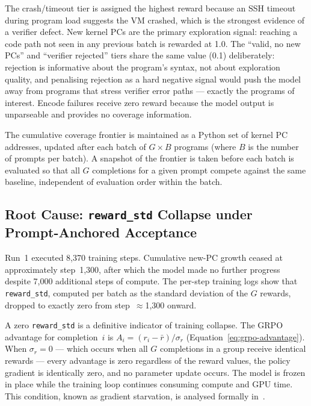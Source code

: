 The crash/timeout tier is assigned the highest reward because an SSH timeout
during program load suggests the VM crashed, which is the strongest evidence of
a verifier defect.
New kernel PCs are the primary exploration signal: reaching a code path not seen
in any previous batch is rewarded at 1.0.
The ``valid, no new PCs'' and ``verifier rejected'' tiers share the same value
(0.1) deliberately: rejection is informative about the program's syntax, not
about exploration quality, and penalising rejection as a hard negative signal
would push the model away from programs that stress verifier error paths ---
exactly the programs of interest.
Encode failures receive zero reward because the model output is unparseable and
provides no coverage information.

The cumulative coverage frontier is maintained as a Python set of kernel PC
addresses, updated after each batch of $G \times B$ programs (where $B$ is the
number of prompts per batch).
A snapshot of the frontier is taken before each batch is evaluated so that all
$G$ completions for a given prompt compete against the same baseline, independent
of evaluation order within the batch.

\subsection{Root Cause: \texttt{reward\_std} Collapse under Prompt-Anchored Acceptance}
\label{sec:rl-plateau}

Run~1 executed 8,370 training steps.
Cumulative new-PC growth ceased at approximately step~1,300, after which the
model made no further progress despite 7,000 additional steps of compute.
The per-step training logs show that \texttt{reward\_std}, computed per batch as
the standard deviation of the $G$ rewards, dropped to exactly zero from
step~$\approx$1,300 onward.

A zero \texttt{reward\_std} is a definitive indicator of training collapse.
The GRPO advantage for completion~$i$ is
$A_i = (r_i - \bar{r}) / \sigma_r$ (Equation~\ref{eq:grpo-advantage}).
When $\sigma_r = 0$ --- which occurs when all $G$ completions in a group receive
identical rewards --- every advantage is zero regardless of the reward values,
the policy gradient is identically zero, and no parameter update occurs.
The model is frozen in place while the training loop continues consuming compute
and GPU time.
This condition, known as gradient starvation, is analysed formally
in~\cite{grpo-starvation}.

